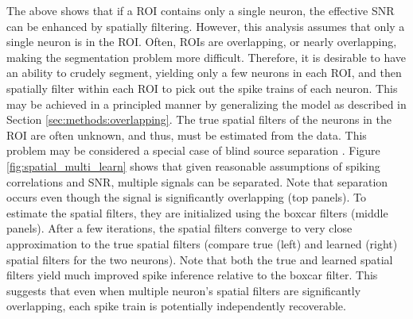 The above shows that if a ROI contains only a single neuron, the effective SNR can be enhanced by spatially filtering.  However, this analysis assumes that only a single neuron is in the ROI.  Often, ROIs are overlapping, or nearly overlapping, making the segmentation problem more difficult.  Therefore, it is desirable to have an ability to crudely segment, yielding only a few neurons in each ROI, and then spatially filter within each ROI to pick out the spike trains of each neuron.  This may be achieved in a principled manner by generalizing the model as described in Section \ref{sec:methods:overlapping}.  %
The true spatial filters of the neurons in the ROI are often unknown, and thus, must be estimated from the data.  This problem may be considered a special case of blind source separation \cite{BellSejnowski95, MukamelSchnitzer09}. Figure \ref{fig:spatial_multi_learn} shows that given reasonable assumptions of spiking correlations and SNR,  multiple signals can be separated.  Note that separation occurs even though the signal is significantly overlapping (top panels). To estimate the spatial filters, they are initialized using the boxcar filters (middle panels).  After a few iterations, the spatial filters converge to very close approximation to the true spatial filters (compare true (left) and learned (right) spatial filters for the two neurons).  Note that both the true and learned spatial filters yield much improved spike inference relative to the boxcar filter.  This suggests that even when multiple neuron's spatial filters are significantly overlapping, each spike train is potentially independently recoverable.  




